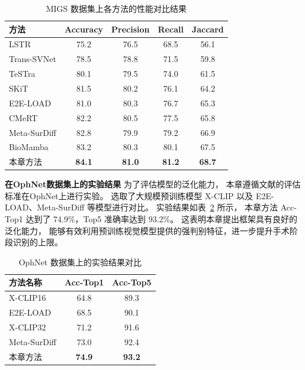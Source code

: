 \begin{table}[htbp]
\small
\centering
\caption{MIGS 数据集上各方法的性能对比结果}
\label{tab:migs_results}
\begin{tabular}{lcccc}
    \toprule
    方法 & Accuracy & Precision & Recall & Jaccard \\ 
    \midrule
    LSTR\cite{xu2021long} & 75.2 & 76.5 & 68.5 & 56.1 \\
    Trans-SVNet\cite{gao2021trans} & 78.5 & 78.8 & 71.5 & 59.8 \\
    TeSTra\cite{zhao2022real} & 80.1 & 79.5 & 74.0 & 61.5 \\
    SKiT\cite{skit2023} & 81.5 & 80.2 & 76.1 & 64.2 \\
    E2E-LOAD\cite{cao2023e2e} & 81.0 & 80.3 & 76.7 & 65.3 \\
    CMeRT\cite{pang2025context} & 82.2 & 80.5 & 77.5 & 65.8 \\
    Meta-SurDiff\cite{li2025meta} & 82.8 & 79.9 & 79.2 & 66.9 \\
    BioMamba\cite{wang2025biomamba} & 83.2 & 80.3 & 80.1 & 67.5 \\
    本章方法 & \textbf{84.1} & \textbf{81.0} & \textbf{81.2} & \textbf{68.7} \\
    \bottomrule
\end{tabular}
\end{table}

\textbf{在OphNet数据集上的实验结果}\quad 
为了评估模型的泛化能力，
本章遵循文献\parencite{li2025meta,hu2024ophnet}的评估标准在OphNet上进行实验。
选取了大规模预训练模型 X-CLIP\cite{ni2022expanding} 
以及 E2E-LOAD\cite{cao2023e2e}、Meta-SurDiff \cite{li2025meta}等模型进行对比。
实验结果如表~\ref{tab:ophnet_results} 所示，
本章方法 Acc-Top1 达到了 74.9\%，Top5 准确率达到 93.2\%。
这表明本章提出框架具有良好的泛化能力，
能够有效利用预训练视觉模型提供的强判别特征，进一步提升手术阶段识别的上限。

\begin{table}[htbp]
\small
\centering
\caption{OphNet 数据集上的实验结果对比}
\label{tab:ophnet_results}
\begin{tabular}{lcc}
    \toprule
    方法名称 & Acc-Top1 & Acc-Top5 \\ 
    \midrule
    X-CLIP16\cite{ni2022expanding} & 64.8 & 89.3 \\
    E2E-LOAD\cite{cao2023e2e} & 68.5 & 90.1 \\ 
    X-CLIP32\cite{ni2022expanding} & 71.2 & 91.6  \\
    Meta-SurDiff\cite{li2025meta} & 73.0 & 92.4   \\
    本章方法  & \textbf{74.9} & \textbf{93.2} \\ 
    \bottomrule
\end{tabular}
\end{table}

